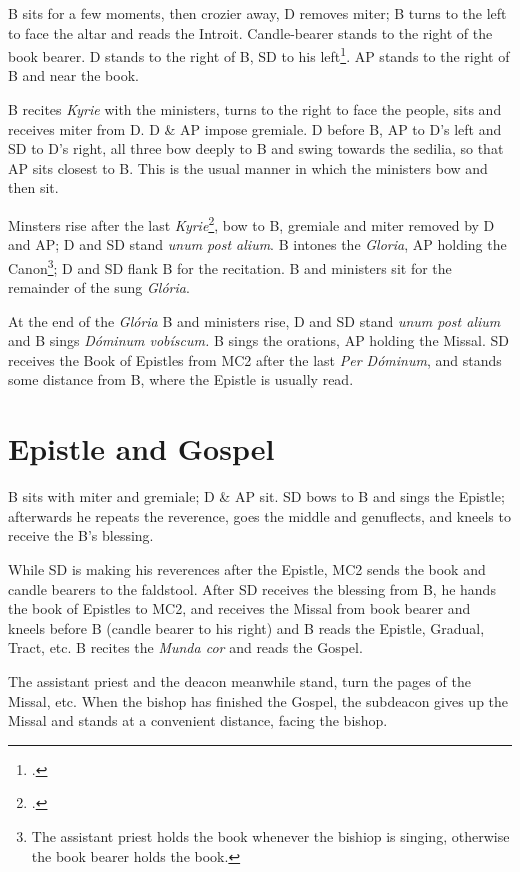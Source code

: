 \documentclass[letterpaper]{report}
\begin{document}
{\rubric B sits for a few moments, then crozier away, D removes miter; B turns
to the left to face the altar and reads the Introit. Candle-bearer stands to
the right of the book bearer. D stands to the right of B, SD to his
left\footcite[See note 5, p. 241,][]{stehle}. AP stands to the right of B and
near the book.

\rubric B recites \textit{Kyrie} with the ministers, turns to the right to face
the people, sits and receives miter from D. D \& AP impose gremiale. D before
B, AP to D's left and SD to D's right, all three bow deeply to B and swing
towards the sedilia, so that AP sits closest to B. This is the usual manner in
which the ministers bow and then sit.

\rubric Minsters rise after the last \textit{Kyrie}\footcite[][227, p.
241]{stehle}, bow to B, gremiale and miter removed by D and AP; D and SD stand
\textit{unum post alium}. B intones the \textit{Gloria}, AP holding the
Canon\footnote{The assistant priest holds the book whenever the bishiop is
singing, otherwise the book bearer holds the book.}; D and SD flank B for the
recitation. B and ministers sit for the remainder of the sung \textit{Glória}.

\rubric At the end of the \textit{Glória} B and ministers rise, D and SD stand
\textit{unum post alium} and B sings \textit{Dóminum vobíscum.} B sings the
orations, AP holding the Missal. SD receives the Book of Epistles from MC2
after the last \textit{Per Dóminum}, and stands some distance from B, where the
Epistle is usually read.

\section{Epistle and Gospel}

\rubric B sits with miter and gremiale; D \& AP sit. SD bows to B and sings the
Epistle; afterwards he repeats the reverence, goes the middle and genuflects,
and kneels to receive the B's blessing.

\rubric While SD is making his reverences after the Epistle, MC2 sends the book
and candle bearers to the faldstool. After SD receives the blessing from B, he
hands the book of Epistles to MC2, and receives the Missal from book bearer and
kneels before B (candle bearer to his right) and B reads the Epistle, Gradual,
Tract, etc. B recites the \textit{Munda cor} and reads the Gospel.

The assistant priest and the deacon meanwhile stand, turn the pages of the
Missal, etc. When the bishop has finished the Gospel, the subdeacon gives up the
Missal and stands at a convenient distance, facing the bishop.

}
\end{document}

